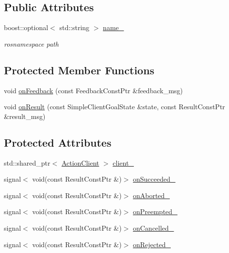 \subsection*{Public Attributes}
\begin{DoxyCompactItemize}
\item 
boost\+::optional$<$ std\+::string $>$ \hyperlink{classsmacc_1_1SmaccActionClientBase_a7fa0e4b63069bea12d47a83bd0be73d7}{name\+\_\+}
\begin{DoxyCompactList}\small\item\em rosnamespace path \end{DoxyCompactList}\end{DoxyCompactItemize}
\subsection*{Protected Member Functions}
\begin{DoxyCompactItemize}
\item 
void \hyperlink{classsmacc_1_1SmaccActionClientBase_ab65d16595371809927fdffe8c20c9bd0}{on\+Feedback} (const Feedback\+Const\+Ptr \&feedback\+\_\+msg)
\item 
void \hyperlink{classsmacc_1_1SmaccActionClientBase_ab04cd1fa7f5417df74c28e44cfdc15c5}{on\+Result} (const Simple\+Client\+Goal\+State \&state, const Result\+Const\+Ptr \&result\+\_\+msg)
\end{DoxyCompactItemize}
\subsection*{Protected Attributes}
\begin{DoxyCompactItemize}
\item 
std\+::shared\+\_\+ptr$<$ \hyperlink{classsmacc_1_1SmaccActionClientBase_a87770be9a701846564593ce36d79cfa2}{Action\+Client} $>$ \hyperlink{classsmacc_1_1SmaccActionClientBase_a5ec5c74015ea4e8b61d017f666a4ce17}{client\+\_\+}
\item 
signal$<$ void(const Result\+Const\+Ptr \&)$>$ \hyperlink{classsmacc_1_1SmaccActionClientBase_a033d789a6688b5064be4843a82fa007f}{on\+Succeeded\+\_\+}
\item 
signal$<$ void(const Result\+Const\+Ptr \&)$>$ \hyperlink{classsmacc_1_1SmaccActionClientBase_acb66868d20faa3c5d7065991b4a306ec}{on\+Aborted\+\_\+}
\item 
signal$<$ void(const Result\+Const\+Ptr \&)$>$ \hyperlink{classsmacc_1_1SmaccActionClientBase_afa8833dad78e3e3991cfec0e396b24c9}{on\+Preempted\+\_\+}
\item 
signal$<$ void(const Result\+Const\+Ptr \&)$>$ \hyperlink{classsmacc_1_1SmaccActionClientBase_a5b27bf8941692efb4f98d0747bcbfb7e}{on\+Cancelled\+\_\+}
\item 
signal$<$ void(const Result\+Const\+Ptr \&)$>$ \hyperlink{classsmacc_1_1SmaccActionClientBase_a729484addba07d0eaf253f22456615fd}{on\+Rejected\+\_\+}
\end{DoxyCompactItemize}


